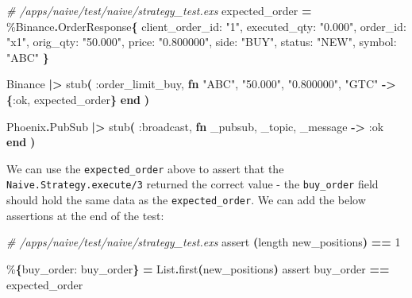 \documentclass[
  oneside]{book}
\newenvironment{Shaded}{\begin{snugshade}}{\end{snugshade}}
\newcommand{\CommentTok}[1]{\textcolor[rgb]{0.56,0.35,0.01}{\textit{#1}}}
\newcommand{\ConstantTok}[1]{\textcolor[rgb]{0.56,0.35,0.01}{#1}}
\newcommand{\DecValTok}[1]{\textcolor[rgb]{0.00,0.00,0.81}{#1}}
\newcommand{\FunctionTok}[1]{\textcolor[rgb]{0.13,0.29,0.53}{\textbf{#1}}}
\newcommand{\KeywordTok}[1]{\textcolor[rgb]{0.13,0.29,0.53}{\textbf{#1}}}
\newcommand{\NormalTok}[1]{#1}
\newcommand{\OperatorTok}[1]{\textcolor[rgb]{0.81,0.36,0.00}{\textbf{#1}}}
\newcommand{\StringTok}[1]{\textcolor[rgb]{0.31,0.60,0.02}{#1}}
\newcommand{\VariableTok}[1]{\textcolor[rgb]{0.00,0.00,0.00}{#1}}
\begin{document}
\begin{Shaded}
\begin{Highlighting}[]
\CommentTok{\# /apps/naive/test/naive/strategy\_test.exs}
\NormalTok{  expected\_order }\OperatorTok{=}\NormalTok{ \%}\ConstantTok{Binance}\OperatorTok{.}\ConstantTok{OrderResponse}\FunctionTok{\{} 
    \VariableTok{client\_order\_id:} \StringTok{"1"}\NormalTok{, }
    \VariableTok{executed\_qty:} \StringTok{"0.000"}\NormalTok{, }
    \VariableTok{order\_id:} \StringTok{"x1"}\NormalTok{, }
    \VariableTok{orig\_qty:} \StringTok{"50.000"}\NormalTok{, }
    \VariableTok{price:} \StringTok{"0.800000"}\NormalTok{, }
    \VariableTok{side:} \StringTok{"BUY"}\NormalTok{, }
    \VariableTok{status:} \StringTok{"NEW"}\NormalTok{, }
    \VariableTok{symbol:} \StringTok{"ABC"}
  \FunctionTok{\}}
 
  \ConstantTok{Binance}
  \OperatorTok{|\textgreater{}}\NormalTok{ stub}\FunctionTok{(}
    \VariableTok{:order\_limit\_buy}\NormalTok{,}
    \KeywordTok{fn} \StringTok{"ABC"}\NormalTok{, }\StringTok{"50.000"}\NormalTok{, }\StringTok{"0.800000"}\NormalTok{, }\StringTok{"GTC"} \OperatorTok{{-}\textgreater{}} \FunctionTok{\{}\VariableTok{:ok}\NormalTok{, expected\_order}\FunctionTok{\}} \KeywordTok{end}   
  \FunctionTok{)}

  \ConstantTok{Phoenix}\OperatorTok{.}\ConstantTok{PubSub}
  \OperatorTok{|\textgreater{}}\NormalTok{ stub}\FunctionTok{(}
    \VariableTok{:broadcast}\NormalTok{,}
    \KeywordTok{fn}\NormalTok{ \_pubsub, \_topic, \_message }\OperatorTok{{-}\textgreater{}} \VariableTok{:ok} \KeywordTok{end}
  \FunctionTok{)}
\end{Highlighting}
\end{Shaded}

We can use the \texttt{expected\_order} above to assert that the \texttt{Naive.Strategy.execute/3} returned the correct value - the \texttt{buy\_order} field should hold the same data as the \texttt{expected\_order}. We can add the below assertions at the end of the test:

\begin{Shaded}
\begin{Highlighting}[]
\CommentTok{\# /apps/naive/test/naive/strategy\_test.exs}
\NormalTok{    assert }\FunctionTok{(}\NormalTok{length new\_positions}\FunctionTok{)} \OperatorTok{==} \DecValTok{1}

\NormalTok{    \%}\FunctionTok{\{}\VariableTok{buy\_order:}\NormalTok{ buy\_order}\FunctionTok{\}} \OperatorTok{=} \ConstantTok{List}\OperatorTok{.}\NormalTok{first}\FunctionTok{(}\NormalTok{new\_positions}\FunctionTok{)}
\NormalTok{    assert buy\_order }\OperatorTok{==}\NormalTok{ expected\_order}
\end{Highlighting}
\end{Shaded}
\end{document}
